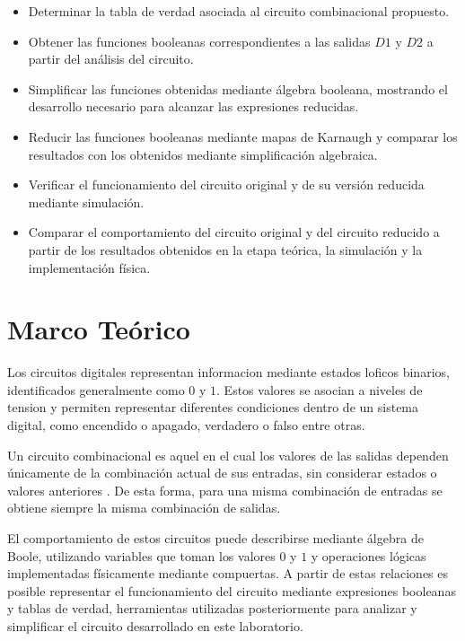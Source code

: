 \documentclass[12pt]{report}
\begin{document}
\begin{itemize}

    \item Determinar la tabla de verdad asociada al circuito combinacional propuesto.

    \item Obtener las funciones booleanas correspondientes a las salidas $D1$ y $D2$ a partir del análisis del circuito.

    \item Simplificar las funciones obtenidas mediante álgebra booleana, mostrando el desarrollo necesario para alcanzar las expresiones reducidas.

    \item Reducir las funciones booleanas mediante mapas de Karnaugh y comparar los resultados con los obtenidos mediante simplificación algebraica.

    \item Verificar el funcionamiento del circuito original y de su versión reducida mediante simulación.

    \item Comparar el comportamiento del circuito original y del circuito reducido a partir de los resultados obtenidos en la etapa teórica, la simulación y la implementación física.

\end{itemize}


\chapter{Marco Teórico}

Los circuitos digitales representan informacion mediante estados loficos binarios, identificados generalmente como $0$ y $1$. Estos valores se asocian a niveles de tension y permiten representar diferentes condiciones dentro de un sistema digital, como encendido o apagado, verdadero o falso entre otras.

Un circuito combinacional es aquel en el cual los valores de las salidas dependen únicamente de la combinación actual de sus entradas, sin considerar estados o  valores anteriores \cite{mitCombinational}. De esta forma, para una misma combinación de entradas se obtiene siempre la misma combinación de salidas.

El comportamiento de estos circuitos puede describirse mediante álgebra de Boole, utilizando variables que toman los valores $0$ y $1$ y operaciones lógicas implementadas físicamente mediante compuertas. A partir de estas relaciones es posible representar el funcionamiento del circuito mediante expresiones booleanas
y tablas de verdad, herramientas utilizadas posteriormente para analizar y simplificar el circuito desarrollado en este laboratorio.
\end{document}
